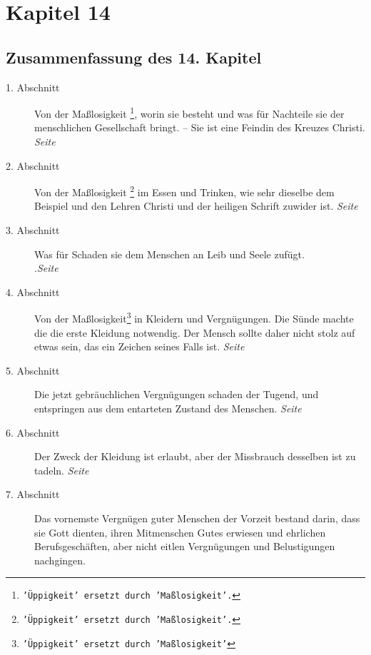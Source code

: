 
\chapter{Kapitel 14} \label{kap14}

\section{Zusammenfassung des 14. Kapitel}

\begin{description}
\item[1. Abschnitt] Von der Maßlosigkeit
\footnote{\texttt{'Üppigkeit' ersetzt durch 'Maßlosigkeit'.}},
worin sie besteht und was für Nachteile
sie der menschlichen Gesellschaft bringt. -- Sie ist eine Feindin des Kreuzes
Christi.
\dotfill \textit{Seite~\pageref{kap14_ab1}}\\
\item[2. Abschnitt] Von der Maßlosigkeit
\footnote{\texttt{'Üppigkeit' ersetzt durch 'Maßlosigkeit'.}}
im Essen und Trinken, wie sehr dieselbe
dem Beispiel und den Lehren Christi und der heiligen Schrift zuwider ist.
\dotfill \textit{Seite~\pageref{kap14_ab2}}\\
\item[3. Abschnitt] Was für Schaden sie dem Menschen an Leib und Seele zufügt.\\
.\dotfill \textit{Seite~\pageref{kap14_ab3}}\\
\item[4. Abschnitt] Von der Maßlosigkeit\footnote{\texttt{'Üppigkeit' ersetzt
durch 'Maßlosigkeit'}} in Kleidern und Vergnügungen. Die Sünde
machte die die erste Kleidung notwendig. Der Mensch sollte daher nicht stolz auf
etwas sein, das ein Zeichen seines Falls ist.
\dotfill \textit{Seite~\pageref{kap14_ab4}}\\
\item[5. Abschnitt] Die jetzt gebräuchlichen Vergnügungen schaden der Tugend,
und
entspringen aus dem entarteten Zustand des Menschen.
\dotfill \textit{Seite~\pageref{kap14_ab5}}\\
\item[6. Abschnitt] Der Zweck der Kleidung ist erlaubt, aber der Missbrauch
desselben ist zu tadeln.
\dotfill \textit{Seite~\pageref{kap14_ab6}}\\
\item[7. Abschnitt] Das vornemste Vergnügen guter Menschen der Vorzeit bestand
darin, dass sie Gott dienten, ihren Mitmenschen Gutes erwiesen und ehrlichen
Berufsgeschäften, aber nicht eitlen Vergnügungen und Belustigungen nachgingen.

\end{description}
